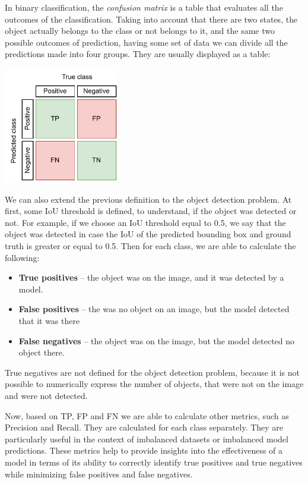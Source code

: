 \documentclass[14pt,a4paper]{extarticle}
\newcounter{e}
\newcounter{tabl}
\numberwithin{equation}{section}
\numberwithin{figure}{section}
\begin{document}
In binary classification, the \textit{confusion matrix} is a table that evaluates all the outcomes of the classification. Taking into account that there are two states, the object actually belongs to the class or not belongs to it, and the same two possible outcomes of prediction, having some set of data we can divide all the predictions made into four groups. They are usually displayed as a table:

\begin{center}
    \includegraphics[width=5cm]{images/confusion-matrix.pdf}
\end{center}

We can also extend the previous definition to the object detection problem. At first, some IoU threshold is defined, to understand, if the object was detected or not. For example, if we choose an IoU threshold equal to 0.5, we say that the object was detected in case the IoU of the predicted bounding box and ground truth is greater or equal to 0.5. Then for each class, we are able to calculate the following:
\begin{itemize}
    \item \textbf{True positives} -- the object was on the image, and it was detected by a model.
    \item \textbf{False positives} -- the was no object on an image, but the model detected that it was there
    \item \textbf{False negatives} -- the object was on the image, but the model detected no object there.  
\end{itemize}
True negatives are not defined for the object detection problem, because it is not possible to numerically express the number of objects, that were not on the image and were not detected.

Now, based on TP, FP and FN we are able to calculate other metrics, such as Precision and Recall. They are calculated for each class separately. They are particularly useful in the context of imbalanced datasets or imbalanced model predictions. These metrics help to provide insights into the effectiveness of a model in terms of its ability to correctly identify true positives and true negatives while minimizing false positives and false negatives.
\end{document}
